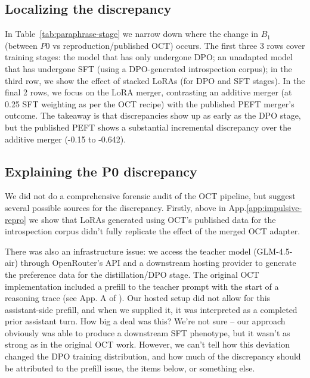 \documentclass{article}
\begin{document}
\subsection{Localizing the discrepancy}
In Table~\ref{tab:paraphrase-stage} we narrow down where the change in $B_1$ (between $P0$ vs reproduction/published OCT) occurs. The first three 3 rows cover training stages: the model that has only undergone DPO; an unadapted model that has undergone SFT (using a DPO-generated introspection corpus); in the third row, we show the effect of stacked LoRAs (for DPO and SFT stages). In the final 2 rows, we focus on the LoRA merger, contrasting an additive merger (at 0.25 SFT weighting as per the OCT recipe) with the published PEFT merger's outcome. The takeaway is that discrepancies show up as early as the DPO stage, but the published PEFT shows a substantial incremental discrepancy over the additive merger (-0.15 to -0.642).





\subsection{Explaining the P0 discrepancy}

We did not do a comprehensive forensic audit of the OCT pipeline, but suggest several possible sources for the discrepancy. Firstly, above in App.\ref{app:impulsive-repro} we show that LoRAs generated using OCT's published data for the introspection corpus didn't fully replicate the effect of the merged OCT adapter.

There was also an infrastructure issue: we access the teacher model (GLM-4.5-air) through OpenRouter's API and a downstream hosting provider to generate the preference data for the distillation/DPO stage. The original OCT implementation included a prefill to the teacher prompt with the start of a reasoning trace (see App. A of \citep{maiya2025opencharactertrainingshaping}). Our hosted setup did not allow for this assistant-side prefill, and when we supplied it, it was interpreted as a completed prior assistant turn. How big a deal was this? We're not sure -- our approach obviously was able to produce a downstream SFT phenotype, but it wasn't as strong as in the original OCT work. However, we can't tell how this deviation changed the DPO training distribution, and how much of the discrepancy should be attributed to the prefill issue, the items below, or something else.
\end{document}
